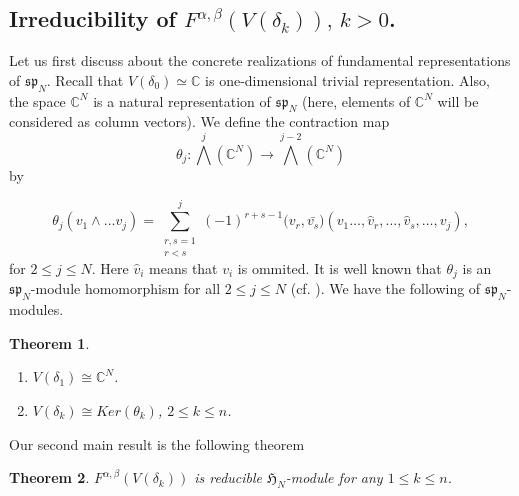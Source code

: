 \documentclass[a4paper,11pt]{amsart}
\numberwithin{equation}{section}
\theoremstyle{plain}
\newtheorem{theorem}{Theorem}[section]
\newcommand{\C}{\mathbb{C}}
\newcommand{\s}{\mathfrak{sp}_{N}}
\newcommand{\Ha}{\mathfrak{H}_{N}}
\begin{document}
\subsection{Irreducibility of $F^{\alpha,\beta}(V(\delta_k)), \, k>0$.}

Let us first discuss about the concrete realizations of fundamental representations of $\s$. Recall that $V(\delta_0)\simeq \C$ is one-dimensional trivial representation. Also, the space 
$\C^N$ is a natural representation of $\s$ (here, elements of $\C^N$ will be considered as column vectors). We define the contraction map $$\theta_j:\bigwedge^j(\C^N)\rightarrow \bigwedge^{j-2}(\C^N)$$ by 

\begin{equation}
    \theta_j(v_1\wedge \dots v_j)=\sum_{\substack{r,s=1\\ r<s}}^j (-1)^{r+s-1}\bm{(}v_r ,\bar{v_s }\bm{)}(v_1\dots, \hat{v}_r,\dots ,\hat{v}_{s},\dots ,v_j),
\end{equation}
for $2\leq j\leq N$. Here $\hat{v}_i$ means that $v_i$ is ommited. It is well known that $\theta_j$ is an $\s$-module homomorphism for all $2\leq j\leq N$ (cf.  \cite[Proposition 13.25]{C05}). We have the following of $\s$-modules.

\begin{theorem}\cite[Theorem 13.28]{C05}\label{cart}
    \begin{enumerate}
        \item[(i)] $V(\delta_1)\cong \C^N$.
        \item[(ii)] $V(\delta_k)\cong Ker(\theta_k)$,  $2\leq k \leq n$.
    \end{enumerate}
    \end{theorem}


 

Our second main result is the following theorem

    \begin{theorem}\label{thm1kn}
        $F^{\alpha,\beta}(V(\delta_k))$ is reducible $\Ha$-module for any $1\leq k\leq n$.
    \end{theorem}
    
\end{document}
